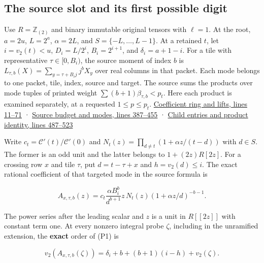 \documentclass[
  11pt,
]{article}
\begin{document}
\subsection{The source slot and its first possible
digit}\label{v9-the-source-slot-and-its-first-possible-digit}

Use \(R=\mathbb Z_{(2)}\) and binary immutable original tensors with
\(\ell=1\). At the root, \(a=2u\), \(L=2^a\), \(\alpha=2L\), and
\(S=\{-L,\ldots,L-1\}\). At a retained \(t\), let \(i=v_2(t)<u\),
\(D_i=L/2^i\), \(B_i=2^{i+1}\), and \(\delta_i=a+1-i\). For a tile with
representative \(\tau\in[0,B_i)\), the source moment of index \(b\) is
\(L_{\tau,b}(X)=\sum_{y=\tau+B_i j}j^b X_y\) over real columns in that
packet. Each mode belongs to one packet, tile, index, source and target.
The source sums the products over mode tuples of printed weight
\(\sum(b+1)\beta_{\tau,b}<p_t\). Here each product is examined
separately, at a requested \(1\le p\le p_t\).
\href{https://github.com/openai/math/blob/main/preprints/The-Exponential-Time-Hypothesis-is-False-October-25-2026/build/quantitative-contraction.tex\#L11}{Coefficient
ring and lifts, lines 11--71} ·
\href{https://github.com/openai/math/blob/main/preprints/The-Exponential-Time-Hypothesis-is-False-October-25-2026/build/quantitative-contraction.tex\#L387}{Source
budget and modes, lines 387--455} ·
\href{https://github.com/openai/math/blob/main/preprints/The-Exponential-Time-Hypothesis-is-False-October-25-2026/build/quantitative-contraction.tex\#L487}{Child
entries and product identity, lines 487--523}

Write \(c_t=\mathcal C'(t)/\mathcal C'(0)\) and
\(N_t(z)=\prod_{d\ne t}(1+\alpha z/(t-d))\) with \(d\in S\). The former
is an odd unit and the latter belongs to \(1+(2z)R[2z]\). For a crossing
row \(x\) and tile \(\tau\), put \(d=t-\tau+x\) and \(h=v_2(d)\le i\).
The exact rational coefficient of that targeted mode in the source
formula is

\[
 A_{x,\tau,b}(z)=
 c_t\frac{\alpha B_i^b}{d^{b+1}}z\,N_t(z)
      (1+\alpha z/d)^{-b-1}.
 \tag{P1}
\]

The power series after the leading scalar and \(z\) is a unit in
\(R[[2z]]\) with constant term one. At every nonzero integral probe
\(\zeta\), including in the unramified extension, the \textbf{exact}
order of (P1) is

\[
 v_2(A_{x,\tau,b}(\zeta))
   =\delta_i+b+(b+1)(i-h)+v_2(\zeta).
 \tag{P2}
\]
\end{document}
